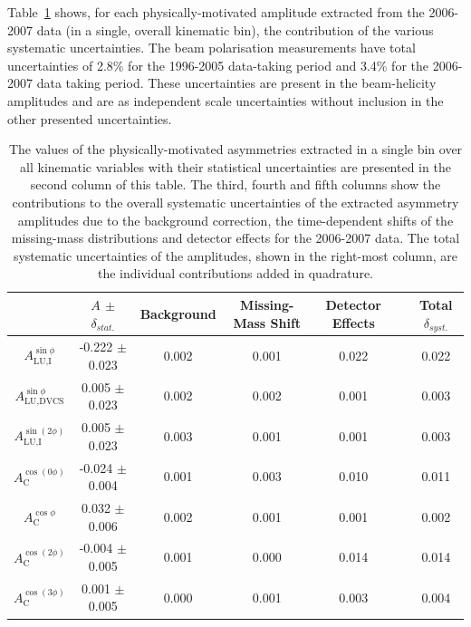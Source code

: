 \documentclass[11pt,a4paper]{article}
\begin{document}
Table~\ref{table_systematic_contributions_0607} shows, for each
physically-motivated amplitude extracted from the 2006-2007 data (in a
single, overall kinematic bin), the contribution of the various
systematic uncertainties. The beam polarisation measurements have total uncertainties of 2.8\% for the 1996-2005 data-taking period and 3.4\% for the 2006-2007 data taking period. These uncertainties are present in the beam-helicity amplitudes and are as independent scale uncertainties without inclusion in the other presented uncertainties.
\begin{table}
 \begin{center}
\resizebox{\textwidth}{!} {
 \begin{tabular}{|c|c||c|c|c|c|c|}
  \hline
 & $A$ $\pm$ $\delta_{stat.}$& Background & Missing-Mass Shift  & Detector Effects & & Total $\delta_{syst.}$ \\
  \hline
  \hline
  $A_{\textrm{LU,I}}^{\sin\phi}$ & -0.222  $\pm$  0.023  & 0.002 & 0.001 & 0.022 & & 0.022 \\
  \hline
  $A_{\textrm{LU,DVCS}}^{\sin\phi}$ & 0.005  $\pm$  0.023  & 0.002 & 0.002 & 0.001 & & 0.003 \\
  \hline
  $A_{\textrm{LU,I}}^{\sin(2\phi)}$ & 0.005  $\pm$  0.023  & 0.003 & 0.001 & 0.001 & & 0.003 \\
  \hline
  \hline
  $A_{\textrm{C}}^{\cos(0\phi)}$ & -0.024 $\pm$  0.004 & 0.001 & 0.003 & 0.010 & & 0.011 \\
  \hline
  $A_{\textrm{C}}^{\cos\phi}$ & 0.032  $\pm$  0.006 & 0.002 & 0.001 & 0.001 & & 0.002 \\
  \hline
  $A_{\textrm{C}}^{\cos(2\phi)}$ & -0.004  $\pm$  0.005 & 0.001 & 0.000 & 0.014 & & 0.014 \\
  \hline
  $A_{\textrm{C}}^{\cos(3\phi)}$ & 0.001  $\pm$   0.005 & 0.000 & 0.001 & 0.003 & & 0.004 \\
  \hline
 \end{tabular}
}
  \caption{The values of the physically-motivated asymmetries extracted in a single bin over all kinematic variables with their statistical uncertainties are presented in the second column of this table. The third, fourth and fifth columns show the contributions to the overall systematic uncertainties of the extracted asymmetry amplitudes due to the background correction, the time-dependent shifts of the missing-mass distributions and detector effects for the 2006-2007 data. The total
systematic uncertainties of the amplitudes, shown in the right-most column, are the individual contributions added in quadrature.}
  \label{table_systematic_contributions_0607}
\end{center}
\end{table}
\end{document}
